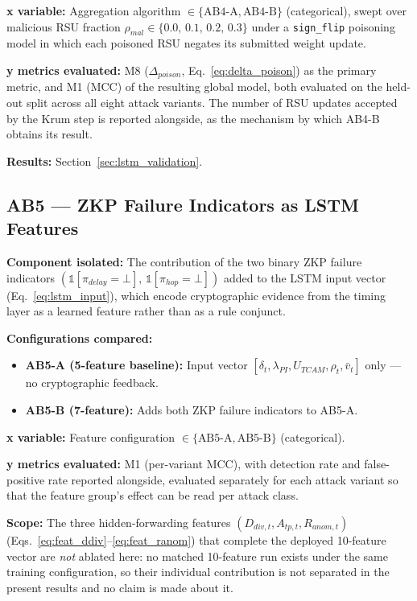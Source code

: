 \documentclass[12pt, a4paper]{report}
\begin{document}
{{\textbf{x variable:} Aggregation algorithm
$\in \{\text{AB4-A}, \text{AB4-B}\}$ (categorical),
swept over malicious \ac{RSU} fraction
$\rho_{mal} \in \{0.0,\, 0.1,\, 0.2,\, 0.3\}$ under a
\texttt{sign\_flip} poisoning model in which each
poisoned \ac{RSU} negates its submitted weight
update.

\textbf{y metrics evaluated:} M8 ($\Delta_{poison}$,
Eq.~\ref{eq:delta_poison}) as the primary metric, and
M1 (\ac{MCC}) of the resulting global model, both
evaluated on the held-out split across all eight
attack variants. The number of \ac{RSU} updates
accepted by the Krum step is reported alongside, as
the mechanism by which AB4-B obtains its result.

\textbf{Results:} Section~\ref{sec:lstm_validation}.

\subsection{AB5 --- ZKP Failure Indicators as
\ac{LSTM} Features}
\label{sec:ab5}

\textbf{Component isolated:}
The contribution of the two binary \ac{ZKP} failure
indicators
$(\mathbb{1}[\pi_{delay}{=}\bot],\,
\mathbb{1}[\pi_{hop}{=}\bot])$ added to the
\ac{LSTM} input vector
(Eq.~\ref{eq:lstm_input}), which encode
cryptographic evidence from the timing layer as a
learned feature rather than as a rule conjunct.

\textbf{Configurations compared:}
\begin{itemize}
    \item \textbf{AB5-A (5-feature baseline):}
    Input vector $[\delta_t, \lambda_{PI},
    U_{TCAM}, \rho_t, \bar{v}_t]$ only --- no
    cryptographic feedback.
    \item \textbf{AB5-B (7-feature):} Adds both
    \ac{ZKP} failure indicators to AB5-A.
\end{itemize}

\textbf{x variable:} Feature configuration
$\in \{\text{AB5-A}, \text{AB5-B}\}$ (categorical).

\textbf{y metrics evaluated:} M1 (per-variant
\ac{MCC}), with detection rate and false-positive
rate reported alongside, evaluated separately for
each attack variant so that the feature group's
effect can be read per attack class.

\textbf{Scope:} The three hidden-forwarding features
$(D_{div,t}, A_{tp,t}, R_{anom,t})$
(Eqs.~\ref{eq:feat_ddiv}--\ref{eq:feat_ranom}) that
complete the deployed 10-feature vector are
\emph{not} ablated here: no matched 10-feature run
exists under the same training configuration, so
their individual contribution is not separated in
the present results and no claim is made about it.

}}
\end{document}
